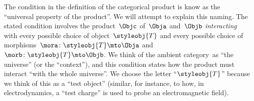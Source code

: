 \begin{remark}
  The condition in the definition of the categorical product is know as the ``universal property of the product''.
  We will attempt to explain this naming.
  The stated condition involves the product~$\Objc$ of~$\Obja$ and~$\Objb$ \emph{interacting} with every possible choice of object~$\styleobj{T}$ and every possible choice of morphisms~$\mora \colon \styleobj{T} \mto \Obja$ and~$\morb\colon \styleobj{T} \mto \Objb$.
  We think of the ambient category~\CatC as ``the universe'' (or the ``context''), and this condition states how the product must interact ``with the whole universe''.
  We choose the letter ``$\styleobj{T}$'' because we think of this as a ``test object'' (similar, for instance,  to how, in electrodynamics, a ``test charge'' is used to probe an electromagnetic field).
\end{remark}


